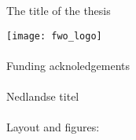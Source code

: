 
\Large{The title of the thesis}

\newpage

\vspace{6cm}


\texttt{[image: fwo\_logo]}

\paragraph*{}
Funding acknoledgements 

\paragraph*{}
Nedlandse titel

\paragraph*{}

Layout and figures: